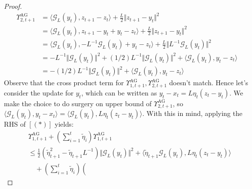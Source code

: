 \documentclass[12pt]{article}
\begin{document}
\begin{proof}
            \begin{align*}
                \Upsilon_{2, t + 1}^{\text{AG}} 
                &= 
                \langle \mathcal G_L(y_t), z_{t + 1} - z_t\rangle + 
                \frac{L}{2}\Vert z_{t + 1} - y_t\Vert^2
                \\
                &= 
                \langle \mathcal G_L(y_t), z_{t + 1} - y_t + y_t - z_t\rangle
                + \frac{L}{2}\Vert z_{t + 1} - y_t\Vert^2
                \\
                &= 
                \langle \mathcal G_L(y_t), - L^{-1} \mathcal G_L(y_t) + y_t - z_t\rangle
                + 
                \frac{L}{2}\Vert L^{-1}\mathcal G_L(y_t)\Vert^2
                \\
                &= 
                -L^{-1}\Vert \mathcal G_L(y_t)\Vert^2 
                + 
                (1/2)L^{-1}\Vert \mathcal G_L(y_t)\Vert^2 
                + 
                \langle \mathcal G_L(y_t), y_t - z_t\rangle
                \\
                &= 
                -(1/2)L^{-1}\Vert \mathcal G_L(y_t)\Vert^2
                + 
                \langle \mathcal G_L(y_t), y_t - z_t\rangle
            \end{align*}
            Observe that the cross product term for $\Upsilon_{1, t + 1}^\text{AG}, \Upsilon_{2, t + 1}^\text{AG}$ doesn't match. 
            Hence let's consider the update for $y_t$, which can be written as $y_t - x_t = L \eta_t (z_t - y_t)$. We make the choice to do surgery on upper bound of $\Upsilon_{2, t + 1}^\text{AG}$, so $\langle \mathcal G_L(y_t), y_t - x_t\rangle = \langle \mathcal G_L(y_t), L \eta_t (z_t - y_t)\rangle$. 
            With this in mind, applying the RHS of $[(*)]$ yields: 
            {\footnotesize
            \begin{align*}
                &\Upsilon_{1, t + 1}^\text{AG} + 
                \left(
                    \sum_{i = 1}^{t}\tilde\eta_i 
                \right)\Upsilon_{1, t + 1}^{\text{AG}}
                \\
                &\le 
                \frac{1}{2}\left(
                    \tilde\eta_{t + 1}^2 - \tilde\eta_{t + 1}L^{-1}
                \right)\Vert \mathcal G_L(y_t)\Vert^2 
                + 
                \langle \tilde\eta_{t + 1} \mathcal G_L(y_t), L\eta_t(z_t - y_t)\rangle
                \\
                &\quad 
                + 
                \left(
                    \sum_{i = 1}^{t}\tilde\eta_i 
                \right)\left(

\end{align*}}
\end{proof}
\end{document}

